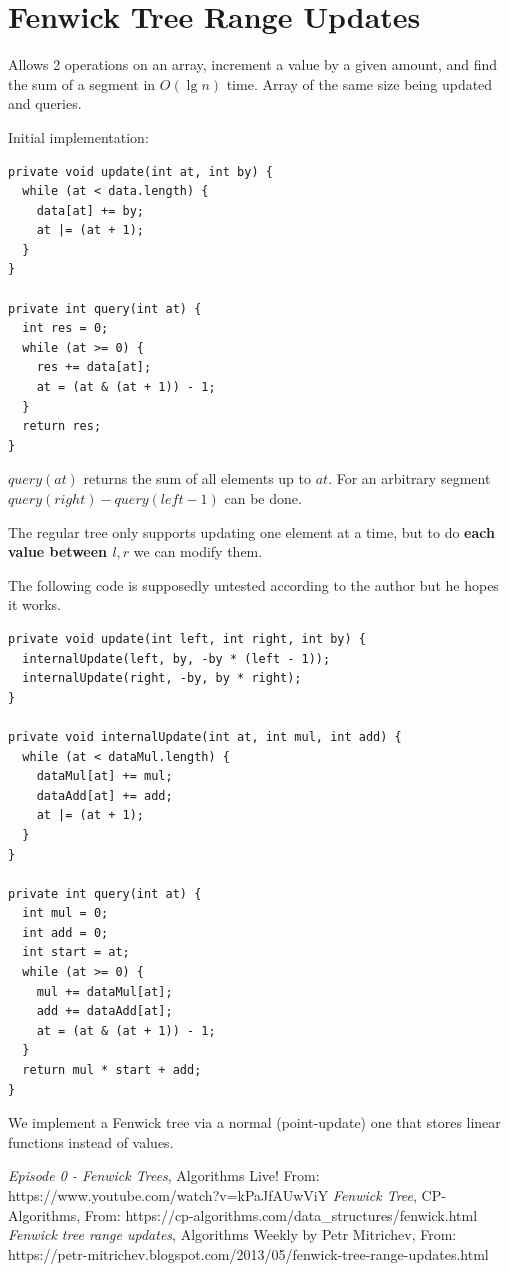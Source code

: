 \documentclass{IEEEtran}
\begin{document}
  \section{Fenwick Tree Range Updates}
    Allows 2 operations on an array, increment a value by a given amount, and find the sum of a segment in $O(\lg{n})$ time. Array of the same size being updated and queries.\par
    Initial implementation:
    \begin{lstlisting}
private void update(int at, int by) {
  while (at < data.length) {
    data[at] += by;
    at |= (at + 1);
  }
}
    
private int query(int at) {
  int res = 0;
  while (at >= 0) {
    res += data[at];
    at = (at & (at + 1)) - 1;
  }
  return res;
}
    \end{lstlisting}
    \par $query(at)$ returns the sum of all elements up to $at$. For an arbitrary segment $query(right)-query(left-1)$ can be done.\par
    The regular tree only supports updating one element at a time, but to do \textbf{each value between $l,r$} we can modify them.\par
    The following code is supposedly untested according to the author but he hopes it works.
    \begin{lstlisting}
private void update(int left, int right, int by) {
  internalUpdate(left, by, -by * (left - 1));
  internalUpdate(right, -by, by * right);
}
    
private void internalUpdate(int at, int mul, int add) {
  while (at < dataMul.length) {
    dataMul[at] += mul;
    dataAdd[at] += add;
    at |= (at + 1);
  }
}
    
private int query(int at) {
  int mul = 0;
  int add = 0;
  int start = at;
  while (at >= 0) {
    mul += dataMul[at];
    add += dataAdd[at];
    at = (at & (at + 1)) - 1;
  }
  return mul * start + add;
}
    \end{lstlisting}
    \par We implement a Fenwick tree via a normal (point-update) one that stores linear functions instead of values.
  \begin{thebibliography}{}
      \textit{Episode 0 - Fenwick Trees},
      Algorithms Live!
      From: https://www.youtube.com/watch?v=kPaJfAUwViY
      \textit{Fenwick Tree},
      CP-Algorithms,
      From: https://cp-algorithms.com/data\_structures/fenwick.html 
      \textit{Fenwick tree range updates},
      Algorithms Weekly by Petr Mitrichev,
      From: https://petr-mitrichev.blogspot.com/2013/05/fenwick-tree-range-updates.html
  \end{thebibliography}
\end{document}
